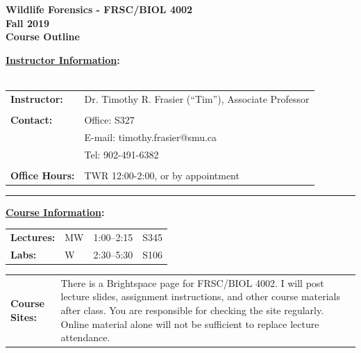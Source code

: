 \documentclass[hidelinks]{article}
\begin{document}
\vspace*{0.01cm}

\begin{center}
	\Large{\textbf{Wildlife Forensics - FRSC/BIOL 4002\\
	Fall 2019\\
	Course Outline}}
\end{center}


\textbf{\underline{Instructor Information}:}\\
\\
	\begin{tabular}{@{} p{2.3cm} l }
		\textbf{Instructor:}	& Dr. Timothy R. Frasier (``Tim''), Associate Professor\\
		\\
		\textbf{Contact:} 	& Office: S327\\
					& E-mail: timothy.frasier@smu.ca\\
					& Tel: 902-491-6382\\
		\\
		\textbf{Office Hours:} & TWR 12:00-2:00, or by appointment				
	\end{tabular}

	\begin{center}
		\rule{4cm}{0.5pt}
	\end{center}


\textbf{\underline{Course Information}:}


	\begin{tabular}{@{} p{2.3cm} l l l}
		\textbf{Lectures:} & MW & 1:00--2:15 & S345\\
		\textbf{Labs:} & W & 2:30--5:30 & S106\\
	\end{tabular}
	
	
	\begin{tabular}{@{} p{2.3cm} p{13.9cm}}
		\textbf{Course Sites:} & There is a Brightspace page for FRSC/BIOL 4002. I will post lecture slides, assignment instructions, and other course materials after class. You are responsible for checking the site regularly. Online material alone will not be sufficient to replace lecture attendance.\\
	\end{tabular}
\end{document}
